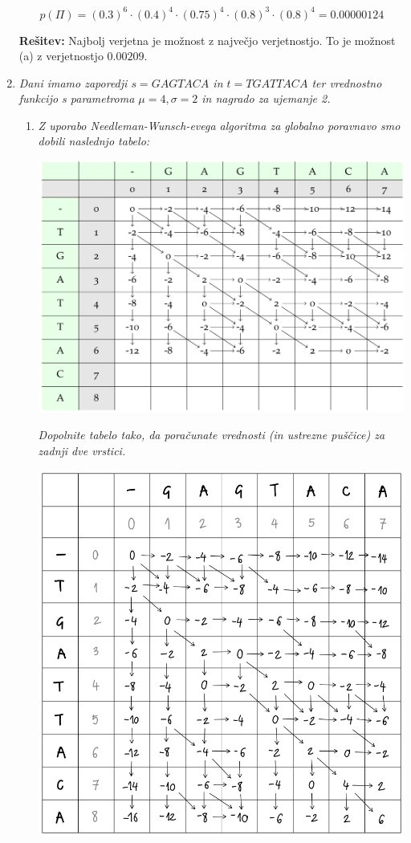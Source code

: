 \documentclass{article}
\begin{document}
\begin{enumerate}
		$$
		p(\Pi) = (0.3)^6 \cdot (0.4)^4 \cdot (0.75)^4 \cdot (0.8)^3 \cdot (0.8)^4 = 0.00000124
		$$

		\textbf{Rešitev:} Najbolj verjetna je možnost z največjo verjetnostjo. To je možnost (a)
		z verjetnostjo $0.00209$.

	\item \textit{Dani imamo zaporedji $s=GAGTACA$ in $t=TGATTACA$ ter vrednostno funkcijo s parametroma
		$\mu = 4, \sigma = 2$ in nagrado za ujemanje 2.}

		\begin{enumerate}
			\item \textit{Z uporabo Needleman-Wunsch-evega algoritma za globalno poravnavo smo dobili
				naslednjo tabelo:}

				\includegraphics[scale=0.2]{NW-tabela.png}

				\textit{Dopolnite tabelo tako, da poračunate vrednosti (in ustrezne puščice) za zadnji dve vrstici.}

				\begin{center}
					\includegraphics[scale=0.25]{matrika-complete-1.png}
				\end{center}


\end{enumerate}
\end{enumerate}
\end{document}
